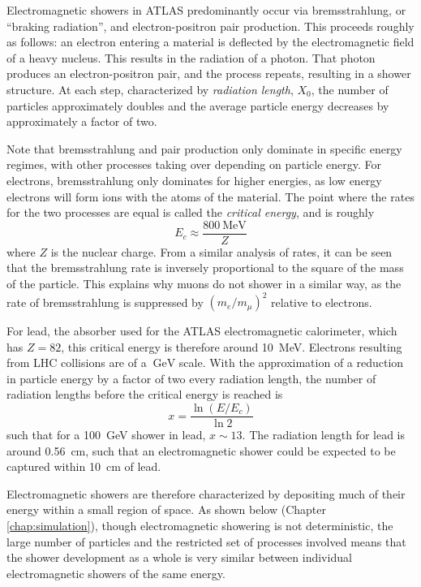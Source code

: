 Electromagnetic showers in ATLAS predominantly occur via bremsstrahlung, or ``braking radiation'', and electron-positron 
pair production. This proceeds roughly as follows: an electron entering a material is deflected by the electromagnetic 
field of a heavy nucleus. This results in the radiation of a photon. That photon produces an electron-positron 
pair, and the process repeats, resulting in a shower structure. At each step, characterized by 
\emph{radiation length}, $X_{0}$, the number of particles approximately doubles and the average particle 
energy decreases by approximately a factor of two. 

Note that bremsstrahlung and pair production only dominate in specific energy regimes, with other processes 
taking over depending on particle energy. For electrons, bremsstrahlung only dominates for higher energies,  
as low energy electrons will form ions with the atoms of the material. The point where the rates for the 
two processes are equal is called the \emph{critical energy}, and is roughly
\begin{equation}
E_{c} \approx \frac{\SI{800}{\MeV}}{Z}
\end{equation}
where $Z$ is the nuclear charge. From a similar analysis of rates, it can be seen that the bremsstrahlung 
rate is inversely proportional to the square of the mass of the particle. This explains why muons do not 
shower in a similar way, as the rate of bremsstrahlung is suppressed by $(m_{e}/m_{\mu})^2$ relative to electrons.

For lead, the absorber used for the ATLAS electromagnetic calorimeter, which has $Z=82$, this critical energy 
is therefore around \SI{10}{\MeV}. Electrons resulting from LHC collisions are of a $\SI{}{\GeV}$ scale. 
With the approximation of a reduction in particle energy by a factor of two every radiation length, the number of radiation lengths before the critical energy is reached is 
\begin{equation}
x = \frac{\ln{(E/E_{c})}}{\ln{2}}
\end{equation}
such that for a \SI{100}{\GeV} shower in lead, $x\sim 13$. The radiation length for lead is around \SI{0.56}{\cm},
such that an electromagnetic shower could be expected to be captured within \SI{10}{\cm} of lead. 

Electromagnetic showers are therefore characterized by depositing much of their energy within a small region 
of space. As shown below (Chapter \ref{chap:simulation}), though electromagnetic showering is not deterministic, 
the large number of particles and the restricted set of processes involved means that the shower development as a whole 
is very similar between individual electromagnetic showers of the same energy.

